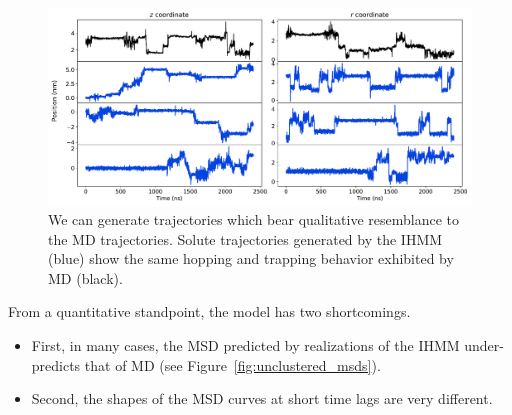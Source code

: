 \documentclass[journal=jpcbfk,manuscript=article]{achemso}
\begin{document}
  \begin{figure}
  \centering
  \includegraphics[width=\textwidth]{qualitative_unclustered_MET2.pdf}
  \caption{We can generate trajectories which bear qualitative resemblance to
  the MD trajectories. Solute trajectories generated by the IHMM (blue) show
  the same hopping and trapping behavior exhibited by MD (black).
  }\label{fig:qualitative_unclustered}
  \end{figure}
  
  \noindent From a quantitative standpoint, the model has two shortcomings.
  \begin{itemize}
  	\item First, in many cases, the MSD predicted by realizations of the IHMM 
  	under-predicts that of MD (see Figure~\ref{fig:unclustered_msds}).
  	\item Second, the shapes of the MSD curves at short time lags are very different.
  \end{itemize}
  
\end{document}
